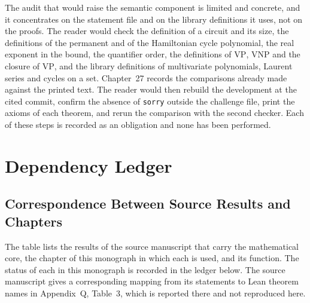 \documentclass[11pt,letterpaper]{report}
\theoremstyle{plain}
\theoremstyle{definition}
\theoremstyle{remark}
\newcommand{\VP}{\mathrm{VP}}
\newcommand{\VNP}{\mathrm{VNP}}
\begin{document}
The audit that would raise the semantic component is limited and concrete, and it concentrates on the statement file and on the library definitions it uses, not on the proofs. The reader would check the definition of a circuit and its size, the definitions of the permanent and of the Hamiltonian cycle polynomial, the real exponent in the bound, the quantifier order, the definitions of $\VP$, $\VNP$ and the closure of $\VP$, and the library definitions of multivariate polynomials, Laurent series and cycles on a set. Chapter~27 records the comparisons already made against the printed text. The reader would then rebuild the development at the cited commit, confirm the absence of \texttt{sorry} outside the challenge file, print the axioms of each theorem, and rerun the comparison with the second checker. Each of these steps is recorded as an obligation and none has been performed.

\chapter{Dependency Ledger}

\section{Correspondence Between Source Results and Chapters}

The table lists the results of the source manuscript that carry the mathematical core, the chapter of this monograph in which each is used, and its function. The status of each in this monograph is recorded in the ledger below. The source manuscript gives a corresponding mapping from its statements to Lean theorem names in Appendix~Q, Table~3, which is reported there and not reproduced here.
\end{document}
